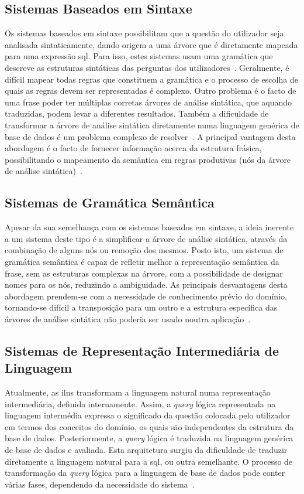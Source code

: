 \subsection{Sistemas Baseados em Sintaxe}
Os sistemas baseados em sintaxe possibilitam que a questão do utilizador seja analisada sintaticamente, dando origem a uma árvore que é diretamente mapeada para uma expressão \gls{sql}. Para isso, estes sistemas usam uma gramática que descreve as estruturas sintáticas das perguntas dos utilizadores~\parencite{nlidb_brief_review}. Geralmente, é difícil mapear todas regras que constituem a gramática e o processo de escolha de quais as regras devem ser representadas é complexo. Outro problema é o facto de uma frase poder ter múltiplas corretas árvores de análise sintática, que aquando traduzidas, podem levar a diferentes resultados. Também a dificuldade de transformar a árvore de análise sintática diretamente numa linguagem genérica de base de dados é um problema complexo de resolver~\parencite{survey_nlidb}. A principal vantagem desta abordagem é o facto de fornecer informação acerca da estrutura frásica, possibilitando o mapeamento da semântica em regras produtivas (nós da árvore de análise sintática)~\parencite{nlidb_brief_review}.

\subsection{Sistemas de Gramática Semântica}
Apesar da sua semelhança com os sistemas baseados em sintaxe, a ideia inerente a um sistema deste tipo é a simplificar a árvore de análise sintática, através da combinação de alguns nós ou remoção dos mesmos. Posto isto, um sistema de gramática semântica é capaz de refletir melhor a representação semântica da frase, sem as estruturas complexas na árvore, com a possibilidade de designar nomes para os nós, reduzindo a ambiguidade. As principais desvantagens desta abordagem prendem-se com a necessidade de conhecimento prévio do domínio, tornando-se difícil a transposição para um outro e a estrutura específica das árvores de análise sintática não poderia ser usado noutra aplicação~\parencite{survey_nlidb, nlidb_brief_review}.

\subsection{Sistemas de Representação Intermediária de Linguagem}
Atualmente, as \glspl{iln} transformam a linguagem natural numa representação intermediária, definida internamente. Assim, a \textit{query} lógica representada na linguagem intermédia expressa o significado da questão colocada pelo utilizador em termos dos conceitos do domínio, os quais são independentes da estrutura da base de dados. Posteriormente, a \textit{query} lógica é traduzida na linguagem genérica de base de dados e avaliada. Esta arquitetura surgiu da dificuldade de traduzir diretamente a linguagem natural para a \gls{sql}, ou outra semelhante. O processo de transformação da \textit{query} lógica para a linguagem de base de dados pode conter várias fases, dependendo da necessidade do sistema~\parencite{nlidb_brief_review}.

